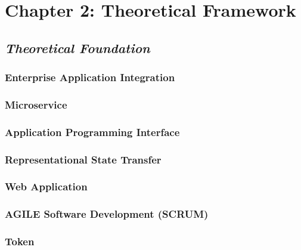 \documentclass[conference, a4paper]{IEEEtran}
\begin{document}



\section{Chapter 2: Theoretical Framework}
\label{sec:citation}

\subsection{\textbf{\textit{Theoretical Foundation}}}
\label{sec:sub:title}

\subsubsection{Enterprise Application Integration}
\label{sec:sub:title}

\subsubsection{Microservice}
\label{sec:sub:title}

\subsubsection{Application Programming Interface}
\label{sec:sub:title}

\subsubsection{Representational State Transfer}
\label{sec:sub:title}

\subsubsection{Web Application}
\label{sec:sub:title}

\subsubsection{AGILE Software Development (SCRUM)}
\label{sec:sub:title}

\subsubsection{Token}
\label{sec:sub:title}
\end{document}
